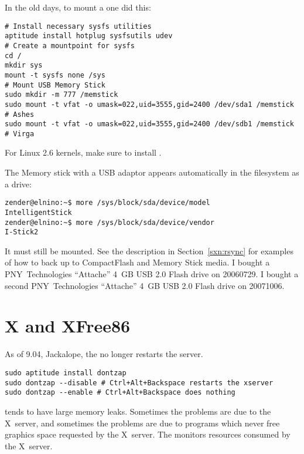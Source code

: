 \documentclass[12pt,twoside]{article}
\begin{document}
In the old days, to mount a  one did this: 
\begin{verbatim}
# Install necessary sysfs utilities
aptitude install hotplug sysfsutils udev
# Create a mountpoint for sysfs
cd /
mkdir sys
mount -t sysfs none /sys
# Mount USB Memory Stick
sudo mkdir -m 777 /memstick
sudo mount -t vfat -o umask=022,uid=3555,gid=2400 /dev/sda1 /memstick # Ashes
sudo mount -t vfat -o umask=022,uid=3555,gid=2400 /dev/sdb1 /memstick # Virga
\end{verbatim}
For Linux 2.6 kernels, make sure to install .

The Memory stick with a USB adaptor appears automatically in the
 filesystem as a  drive:
\begin{verbatim}
zender@elnino:~$ more /sys/block/sda/device/model 
IntelligentStick
zender@elnino:~$ more /sys/block/sda/device/vendor
I-Stick2
\end{verbatim}
It must still be mounted.
See the  description in Section~\ref{sxn:rsync} for
examples of how to back up to CompactFlash and Memory Stick media.
I bought a PNY~Technologies ``Attache'' 4~GB USB 2.0 Flash drive on 20060729.
I bought a second PNY~Technologies ``Attache'' 4~GB USB 2.0 Flash drive on 20071006.

\section{X and XFree86}\label{sxn:x}

As of  9.04,  Jackalope, the 
 no longer restarts the  server.
\begin{verbatim}
sudo aptitude install dontzap
sudo dontzap --disable # Ctrl+Alt+Backspace restarts the xserver
sudo dontzap --enable # Ctrl+Alt+Backspace does nothing
\end{verbatim}

 tends to have large memory leaks. 
Sometimes the problems are due to the X~server, and sometimes the
problems are due to programs which never free graphics space requested
by the X~server. 
The  monitors resources consumed by the X~server.
\end{document}
